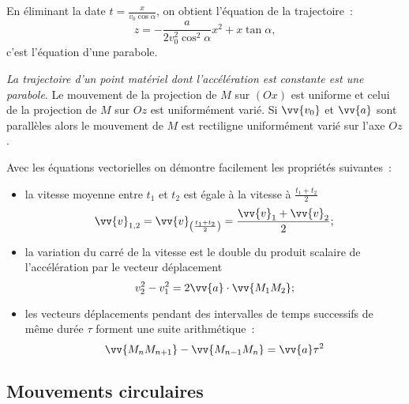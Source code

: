 En éliminant la date $t=\frac{x}{v_0\cos\alpha}$, on obtient l'équation de la trajectoire~:
\begin{equation}
  z = -\frac{a}{2v_0^2\cos^2\alpha}x^2+x\tan\alpha,
\end{equation}
c'est l'équation d'une parabole.

\emph{La trajectoire d'un point matériel dont l'accélération est constante est une parabole}. Le mouvement de la projection de $M$ sur $(Ox)$ est uniforme et celui de la projection de $M$ sur $Oz$ est uniformément varié. Si $\vv{v_0}$ et $\vv{a}$ sont parallèles alors le mouvement de $M$ est rectiligne uniformément varié sur l'axe $Oz$.

Avec les équations vectorielles on démontre facilement les propriétés suivantes~:
\begin{itemize}
\item la vitesse moyenne entre $t_1$ et $t_2$ est égale à la vitesse à $\frac{t_1+t_2}{2}$
  \begin{equation}
    \vv{v}_{1,2}=\vv{v}_{\left(\frac{t_1+t_2}{2}\right)}=\frac{\vv{v}_1+\vv{v}_2}{2};
  \end{equation}
\item la variation du carré de la vitesse est le double du produit scalaire de l'accélération par le vecteur déplacement
  \begin{equation}
v_2^2-v_1^2=2\vv{a}\cdot \vv{M_1M_2};
  \end{equation}
\item les vecteurs déplacements pendant des intervalles de temps successifs de même durée $\tau$ forment une suite arithmétique~:
  \begin{equation}
    \vv{M_nM_{n+1}}-\vv{M_{n-1}M_{n}}=\vv{a}\tau^2
  \end{equation}
\end{itemize}

\subsection{Mouvements circulaires}
\label{chap1-subsec:mvtcirc}


